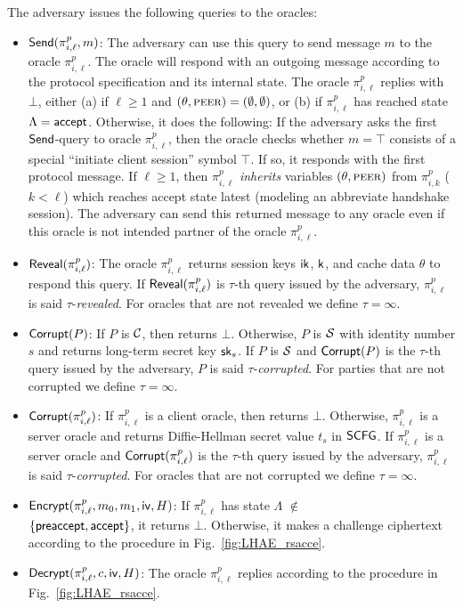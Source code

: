 The adversary issues the following queries to the
oracles:
\begin{itemize}
 \item {$\mathsf{Send}(\pi^p_{i, \ell}, m)$:
 The adversary can use this query to send message
 $m$ to the oracle $\pi^p_{i, \ell}$.
 The oracle will respond with an outgoing message
 according to the protocol specification and its
 internal state.
 The oracle $\pi^p_{i, \ell}$ replies with $\bot$,
 either (a) if $\ell \geq 1$ and
 $(\theta,\textsc{peer}) = (\emptyset, \emptyset)$, or (b)
 if $\pi^p_{i,\ell}$ has reached state
 $\Lambda = \mathsf{accept}$.
 Otherwise, it does the following: If the adversary
 asks the first $\mathsf{Send}$-query to oracle
 $\pi^p_{i, \ell}$, then the oracle checks whether
 $m = \top$ consists of a special
 ``initiate client session'' symbol $\top$.
 If so, it responds with the first protocol message.
 If $\ell \geq 1$,
 then $\pi^p_{i,\ell}$ \textit{inherits} variables $(\theta,\textsc{peer})$ from
 $\pi^p_{i, k}$ ($k < \ell$) which reaches accept state latest
 (modeling an abbreviate handshake session).
 The adversary can send this returned message to any
 oracle even if this oracle is not intended partner of
 the oracle $\pi^p_{i, \ell}$.}

 \item {$\mathsf{Reveal}(\pi^p_{i,\ell})$:
 The oracle $\pi^p_{i,\ell}$ returns session keys
 $\mathsf{ik}$, $\mathsf{k}$, and cache data $\theta$ to respond this query.
 If $\mathsf{Reveal}(\pi^p_{i,\ell})$ is $\tau$-th query issued by the adversary,
 $\pi^p_{i,\ell}$ is said $\tau$-\textit{revealed}.
 For oracles that are not revealed we define
 $\tau = \infty$.}

 \item {$\mathsf{Corrupt}(P)$:
 If $P$ is $\mathcal{C}$, then returns $\bot$.
 Otherwise, $P$ is $\mathcal{S}$ with identity number $s$ and returns long-term
 secret key $\mathsf{sk}_s$.
 If $P$ is $\mathcal{S}$ and $\mathsf{Corrupt}(P)$ is the
 $\tau$-th query issued by the adversary, $P$ is said
 $\tau$-\textit{corrupted}.
 For parties that are not corrupted we define
 $\tau = \infty$.}

\item {$\mathsf{Corrupt}(\pi^p_{i,\ell})$:
 If $\pi^p_{i,\ell}$ is a client oracle, then returns $\bot$.
 Otherwise, $\pi^p_{i,\ell}$ is a server oracle and returns
 Diffie-Hellman secret value $t_s$ in $\mathsf{SCFG}$.
 If $\pi^p_{i,\ell}$ is a server oracle and $\mathsf{Corrupt}(\pi^p_{i,\ell})$ is the
 $\tau$-th query issued by the adversary, $\pi^p_{i,\ell}$ is said
 $\tau$-\textit{corrupted}.
 For oracles that are not corrupted we define
 $\tau = \infty$.}

 \item {$\mathsf{Encrypt}(\pi^p_{i,\ell}, m_0, m_1, \mathsf{iv}, H)$:
 If $\pi^p_{i,\ell}$ has state
 $\Lambda$ $\not\in$ \\ $\{\mathsf{preaccept}, \mathsf{accept}\}$,
 it returns $\bot$.
 Otherwise, it makes a challenge ciphertext according to
 the procedure in Fig.~\ref{fig:LHAE_rsacce}.}

 \item {$\mathsf{Decrypt}(\pi^p_{i, \ell}, c, \mathsf{iv}, H)$:
 The oracle $\pi^p_{i, \ell}$ replies according to the
 procedure in Fig.~\ref{fig:LHAE_rsacce}.}
\end{itemize}

